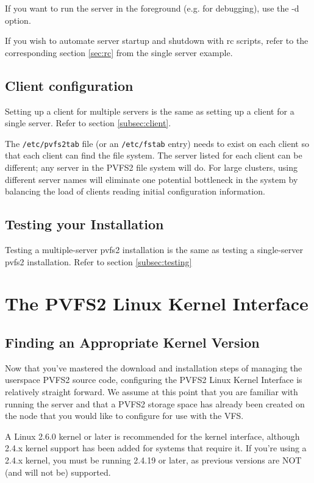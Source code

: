 \documentclass[11pt, letterpaper]{article}
\begin{document}
If you want to run the server in the foreground (e.g. for debugging), use the
-d option.

If you wish to automate server startup and shutdown with rc scripts, refer
to the corresponding section \ref{sec:rc} from the single server example.

\subsection{Client configuration}

Setting up a client for multiple servers is the same as setting up a client
for a single server.  Refer to section \ref{subsec:client}.

The \texttt{/etc/pvfs2tab} file (or an \texttt{/etc/fstab} entry) needs to
exist on each client so that each client can find the file system.  The server
listed for each client can be different; any server in the PVFS2 file system
will do.  For large clusters, using different server names will eliminate one
potential bottleneck in the system by balancing the load of clients reading
initial configuration information.

\subsection {Testing your Installation}

Testing a multiple-server pvfs2 installation is the same as testing a
single-server pvfs2 installation.  Refer to section
\ref{subsec:testing}

\section{The PVFS2 Linux Kernel Interface}
\label{sec:kernel-interface}

\subsection{Finding an Appropriate Kernel Version}
\label{sec:kernel-check}

Now that you've mastered the download and installation steps of
managing the userspace PVFS2 source code, configuring the PVFS2 Linux
Kernel Interface is relatively straight forward.  We assume at this
point that you are familiar with running the server and that a PVFS2
storage space has already been created on the node that you would like
to configure for use with the VFS.

A Linux 2.6.0 kernel or later is recommended for the kernel interface,
although 2.4.x kernel support has been added for systems that require
it.  If you're using a 2.4.x kernel, you must be running 2.4.19 or
later, as previous versions are NOT (and will not be) supported.
\end{document}
